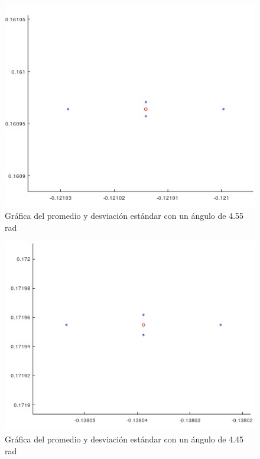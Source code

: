 \documentclass[a4paper, 12pt]{article}
\begin{document}
    \begin{figure}[ht!]
        \centering
        \includegraphics[width=12cm]{img/g5.jpeg}
        \caption{Gráfica del promedio y desviación estándar con un ángulo de 4.55 rad}
        \label{G5}
    \end{figure}

    \begin{figure}[ht!]
        \centering
        \includegraphics[width=12cm]{img/g6.jpeg}
        \caption{Gráfica del promedio y desviación estándar con un ángulo de 4.45 rad}
        \label{G6}
    \end{figure}
\end{document}
